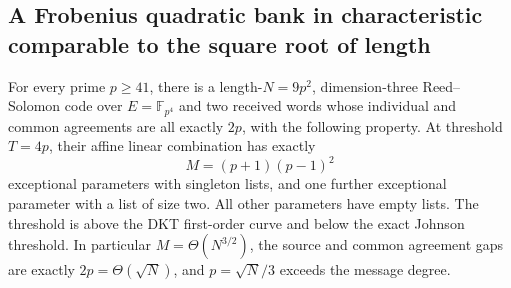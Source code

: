 \subsection{A Frobenius quadratic bank in characteristic comparable to the square root of length}
\label{sec:scaled-frobenius-padding}

\begin{proposition}\label{prop:scaled-frobenius-padding}
For every prime $p\ge41$, there is a length-$N=9p^2$, dimension-three
Reed--Solomon code over $E=\mathbb F_{p^4}$ and two received words whose
individual and common agreements are all exactly $2p$, with the following
property. At threshold $T=4p$, their affine linear combination has exactly
\[
 M=(p+1)(p-1)^2
\]
exceptional parameters with singleton lists, and one further exceptional
parameter with a list of size two. All other parameters have empty lists.
The threshold is above the DKT first-order curve and below the exact
Johnson threshold. In particular $M=\Theta(N^{3/2})$, the source and common
agreement gaps are exactly $2p=\Theta(\sqrt N)$, and
$p=\sqrt N/3$ exceeds the message degree.
\end{proposition}

